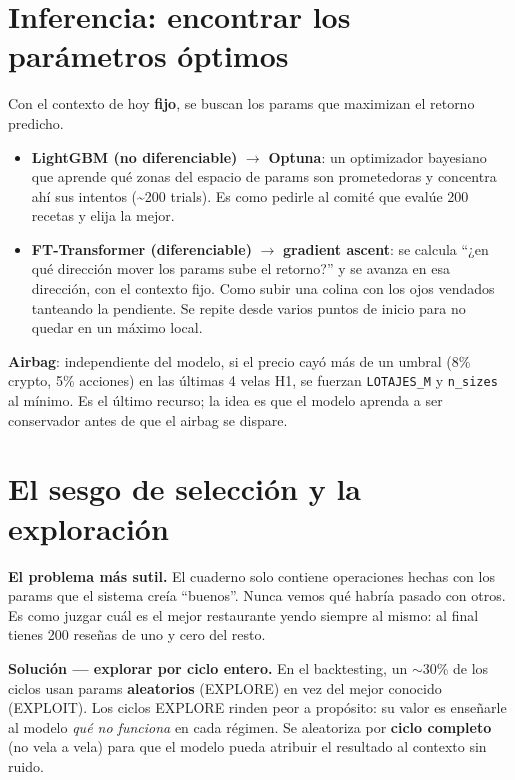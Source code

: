 \documentclass[11pt,a4paper]{article}
\newcommand{\code}[1]{\texttt{#1}}
\begin{document}
\section{Inferencia: encontrar los parámetros óptimos}

Con el contexto de hoy \textbf{fijo}, se buscan los params que maximizan el retorno predicho.

\begin{itemize}[leftmargin=1.4em]
  \item \textbf{LightGBM (no diferenciable)} $\to$ \textbf{Optuna}: un optimizador bayesiano que
  aprende qué zonas del espacio de params son prometedoras y concentra ahí sus intentos
  (\textasciitilde200 trials). Es como pedirle al comité que evalúe 200 recetas y elija la mejor.
  \item \textbf{FT-Transformer (diferenciable)} $\to$ \textbf{gradient ascent}: se calcula
  ``¿en qué dirección mover los params sube el retorno?'' y se avanza en esa dirección, con
  el contexto fijo. Como subir una colina con los ojos vendados tanteando la pendiente. Se
  repite desde varios puntos de inicio para no quedar en un máximo local.
\end{itemize}

\textbf{Airbag}: independiente del modelo, si el precio cayó más de un umbral (8\% crypto,
5\% acciones) en las últimas 4 velas H1, se fuerzan \code{LOTAJES\_M} y \code{n\_sizes} al
mínimo. Es el último recurso; la idea es que el modelo aprenda a ser conservador antes de que
el airbag se dispare.

\section{El sesgo de selección y la exploración}

\textbf{El problema más sutil.} El cuaderno solo contiene operaciones hechas con los params que
el sistema creía ``buenos''. Nunca vemos qué habría pasado con otros. Es como juzgar cuál es el
mejor restaurante yendo siempre al mismo: al final tienes 200 reseñas de uno y cero del resto.

\textbf{Solución — explorar por ciclo entero.} En el backtesting, un $\sim$30\% de los ciclos
usan params \textbf{aleatorios} (EXPLORE) en vez del mejor conocido (EXPLOIT). Los ciclos
EXPLORE rinden peor a propósito: su valor es enseñarle al modelo \emph{qué no funciona} en cada
régimen. Se aleatoriza por \textbf{ciclo completo} (no vela a vela) para que el modelo pueda
atribuir el resultado al contexto sin ruido.
\end{document}

